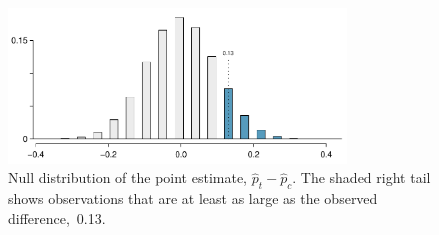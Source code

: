 




\begin{figure}[ht]
\centering
\includegraphics[width=0.8\textwidth]{02/figures/CPR_study/CPR_study_right_tail}
\caption{Null distribution of the point estimate, $\hat{p}_t - \hat{p}_c$. The shaded right tail shows observations that are at least as large as the observed difference,~0.13.}
\label{CPR_study_right_tail}
\end{figure}

